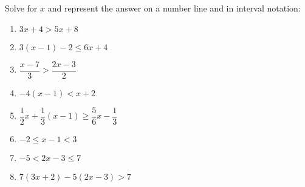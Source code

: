 \begin{exercises}{ }
{
Solve for $x$ and represent the answer on a number line and in interval notation:
\begin{enumerate}[itemsep=6pt, label=\textbf{\arabic*}. ] 
    \item $3x+4>5x+8$
    \item $3(x-1)-2\leq 6x+4$ 
    \item $\dfrac{x-7}{3}>\dfrac{2x-3}{2}$
    \item $-4(x-1)<x+2$
    \item $\dfrac{1}{2}x+\dfrac{1}{3}(x-1)\geq \dfrac{5}{6}x-\dfrac{1}{3}$ 
    \item $-2\leq x-1<3$ 
    \item $-5<2x-3\leq7$ 
\item $7(3x+2)-5(2x-3)>7$
    \end{enumerate}

}
\end{exercises}


